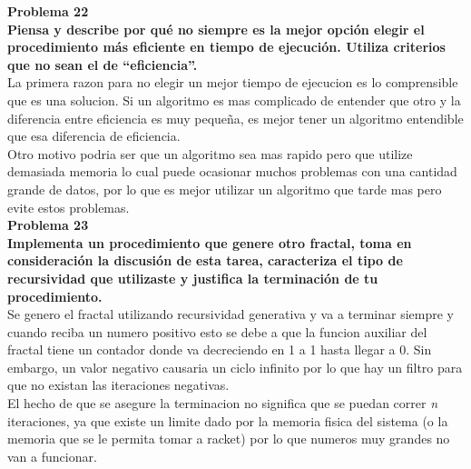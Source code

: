 \documentclass[a4paper]{article}
\begin{document}
\textbf{Problema 22\\
Piensa y describe por qué no siempre es la mejor opción elegir el procedimiento más eficiente en tiempo de ejecución. Utiliza criterios que no sean el de “eficiencia”.}\\
La primera razon para no elegir un mejor tiempo de ejecucion es lo comprensible que es una solucion. Si un algoritmo es mas complicado de entender que otro y la diferencia entre eficiencia es muy pequeña, es mejor tener un algoritmo entendible que esa diferencia de eficiencia.\\
Otro motivo podria ser que un algoritmo sea mas rapido pero que utilize demasiada memoria lo cual puede ocasionar muchos problemas con una cantidad grande de datos, por lo que es mejor utilizar un algoritmo que tarde mas pero evite estos problemas.\\
\textbf{Problema 23\\
Implementa un procedimiento que genere otro fractal, toma en consideración la discusión de esta tarea, caracteriza el tipo de recursividad que utilizaste y justifica la terminación de tu procedimiento.}\\
Se genero el fractal utilizando recursividad generativa y va a terminar siempre y cuando reciba un numero positivo esto se debe a que la funcion auxiliar del fractal tiene un contador donde va decreciendo en 1 a 1 hasta llegar a 0. Sin embargo, un valor negativo causaria un ciclo infinito por lo que hay un filtro para que no existan las iteraciones negativas.\\
El hecho de que se asegure la terminacion no significa que se puedan correr \textit{n} iteraciones, ya que existe un limite dado por la memoria fisica del sistema (o la memoria que se le permita tomar a racket) por lo que numeros muy grandes no van a funcionar.
\end{document}
